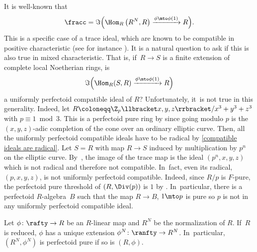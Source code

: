 \begin{remark}
It is well-known that
\[\fracc=\Im\Bigl(\Hom_R\left(R^N,R\right)\xrightarrow{\phi\mto \phi(1)} R\Bigr).\]
This is a specific case of a trace ideal, which are known to be compatible in positive characteristic (see for instance \cite[Lem.\,2.2]{PolstraSchwedeCompatibleIdealsGorensteinRings}). It is a natural question to ask if this is also true in mixed characteristic. That is, if~$R\to S$ is a finite extension of complete local Noetherian rings, is
\[\Im\Bigl(\Hom_R(S,R)\xrightarrow{\phi\mto \phi(1)} R\Bigr)\] a uniformly perfectoid compatible ideal of $R$? Unfortunately, it~is not true in this generality. Indeed, let $R\coloneqq \Z_p\llbracket x,y,z\rrbracket/x^3+y^3+z^3$ with $p\equiv 1 \bmod 3$. This is a perfectoid pure ring by \cite[Ex.\,7.3]{BMPSTWWPerfectoidPure} since going modulo $p$ is the $(x,y,z)$-adic completion of the cone over an ordinary elliptic curve. Then, all the uniformly perfectoid compatible ideals have to be radical by \autoref{compatible ideals are radical}. Let $S=R$ with map $R\to S$ induced by multiplication by $p^n$ on the elliptic curve. By~\cite[Ex.\,4.14]{BMPSTWWMinimalModelProgramMixedCharacteristic}, the image of the trace map is the ideal $(p^n,x,y,z)$ which is not radical and therefore not compatible. In~fact, even its radical, $(p,x,y,z)$, is not uniformly perfectoid compatible. Indeed, since $R/p$ is $F$-pure, the perfectoid pure threshold of $(R,\Div(p))$ is $1$ by \cite[Rem.\,2.10]{YoshikawaComputationMethodPerfectoidPurity}. In~particular, there is a perfectoid $R$\nobreakdash-algebra~$B$ such that the map $R\to B$, $1\mto p$ is pure so $p$ is not in any uniformly perfectoid compatible ideal.
\end{remark}

\begin{corollary}\label{purity extends to normalization}
Let $\phi\colon \rafty\to R$ be an $R$\nobreakdash-linear map and $R^N$ be the normalization of $R$. If~$R$ is reduced, $\phi$ has a unique extension $\phi^N\colon \ranfty \to R^N$. In~particular, $(R^N,\phi^N)$ is perfectoid pure if so is $(R,\phi)$.
\end{corollary}

